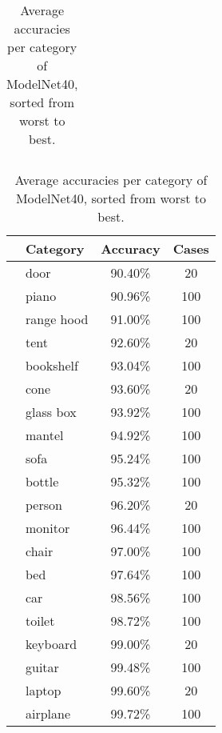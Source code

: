 \begin{table}[]
\begin{tabular}[t]{lccl}
	\end{tabular}
	\begin{tabular}[t]{llcc}
		\hline
		\hspace{4pt} & \textbf{Category} & \textbf{Accuracy} & \textbf{Cases} \\ \hline
		             & door              & 90.40\%           & 20             \\
		             & piano             & 90.96\%           & 100            \\
		             & range hood        & 91.00\%           & 100            \\
		             & tent              & 92.60\%           & 20             \\
		             & bookshelf         & 93.04\%           & 100            \\
		             & cone              & 93.60\%           & 20             \\
		             & glass box         & 93.92\%           & 100            \\
		             & mantel            & 94.92\%           & 100            \\
		             & sofa              & 95.24\%           & 100            \\
		             & bottle            & 95.32\%           & 100            \\
		             & person            & 96.20\%           & 20             \\
		             & monitor           & 96.44\%           & 100            \\
		             & chair             & 97.00\%           & 100            \\
		             & bed               & 97.64\%           & 100            \\
		             & car               & 98.56\%           & 100            \\
		             & toilet            & 98.72\%           & 100            \\
		             & keyboard          & 99.00\%           & 20             \\
		             & guitar            & 99.48\%           & 100            \\
		             & laptop            & 99.60\%           & 20             \\
		             & airplane          & 99.72\%           & 100            \\ \hline
	\end{tabular}

	\caption{Average accuracies per category of ModelNet40, sorted from worst to best.}
	\label{Table:cataccuracies}
\end{table}